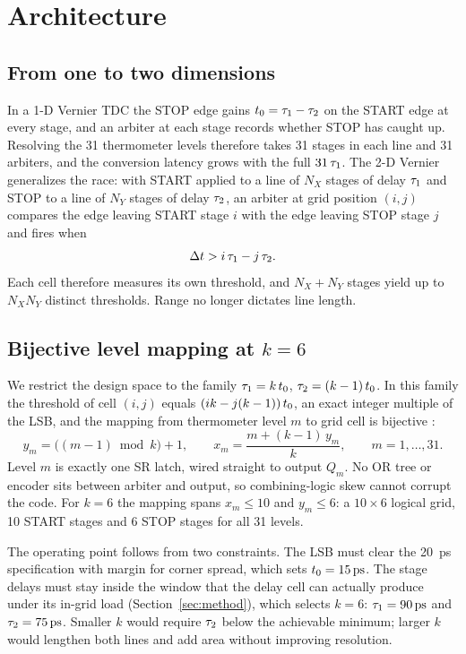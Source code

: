 \section{Architecture}
\label{sec:arch}

\subsection{From one to two dimensions}

In a 1-D Vernier TDC the STOP edge gains $t_{0}=\tau_{1}-\tau_{2}$ on the START
edge at every stage, and an arbiter at each stage records whether STOP has
caught up. Resolving the 31 thermometer levels therefore takes 31 stages in
each line and 31 arbiters, and the conversion latency grows with the full
$31\,\tau_{1}$. The
2-D Vernier \cite{vercesi2010} generalizes the race: with START applied to a
line of $N_X$ stages of delay $\tau_{1}$ and STOP to a line of $N_Y$ stages of
delay $\tau_{2}$, an arbiter at grid position $(i,j)$ compares the edge leaving
START stage $i$ with the edge leaving STOP stage $j$ and fires when
\begin{equation}
  \Delta t > i\,\tau_{1} - j\,\tau_{2}.
  \label{eq:cell}
\end{equation}
Each cell therefore measures its own threshold, and $N_X+N_Y$ stages yield up
to $N_X N_Y$ distinct thresholds. Range no longer dictates line length.

\subsection{Bijective level mapping at $k=6$}

We restrict the design space to the family
$\tau_{1}=k\,t_{0}$, $\tau_{2}=(k-1)\,t_{0}$. In this family the threshold of
cell $(i,j)$ equals $(ik - j(k-1))\,t_{0}$, an exact integer multiple of the
LSB, and the mapping from thermometer level $m$ to grid cell is bijective
\cite{vercesi2010}:
\begin{equation}
  y_m = \bigl((m-1) \bmod k\bigr) + 1,
  \qquad
  x_m = \frac{m + (k-1)\,y_m}{k},
  \qquad m = 1,\dots,31.
  \label{eq:mapping}
\end{equation}
Level $m$ is exactly one SR latch, wired straight to output $Q_m$. No OR tree
or encoder sits between arbiter and output, so combining-logic skew cannot
corrupt the code. For $k=6$ the mapping spans $x_m \le 10$ and $y_m \le 6$: a
$10\times6$ logical grid, 10 START stages and 6 STOP stages for all 31 levels.

The operating point follows from two constraints. The LSB must clear the
\SI{20}{\pico\second} specification with margin for corner spread, which sets
$\tlsb=\SI{15}{\pico\second}$. The stage delays must stay inside the window
that the delay cell can actually produce under its in-grid load
(Section~\ref{sec:method}), which selects $k=6$:
$\ttau{1}=\SI{90}{\pico\second}$ and $\ttau{2}=\SI{75}{\pico\second}$. Smaller
$k$ would require $\tau_{2}$ below the achievable minimum; larger $k$ would
lengthen both lines and add area without improving resolution.

